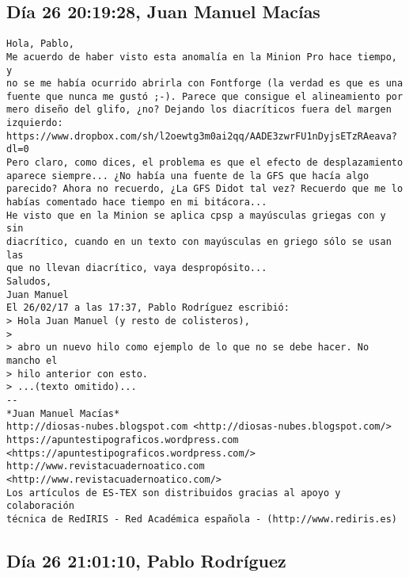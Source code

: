 \documentclass[a4paper,10pt]{article}
\begin{document}
\subsection{Día 26 20:19:28, Juan Manuel Macías}

\begin{lstlisting}
Hola, Pablo,
Me acuerdo de haber visto esta anomalía en la Minion Pro hace tiempo, y 
no se me había ocurrido abrirla con Fontforge (la verdad es que es una 
fuente que nunca me gustó ;-). Parece que consigue el alineamiento por 
mero diseño del glifo, ¿no? Dejando los diacríticos fuera del margen 
izquierdo:
https://www.dropbox.com/sh/l2oewtg3m0ai2qq/AADE3zwrFU1nDyjsETzRAeava?dl=0
Pero claro, como dices, el problema es que el efecto de desplazamiento 
aparece siempre... ¿No había una fuente de la GFS que hacía algo 
parecido? Ahora no recuerdo, ¿La GFS Didot tal vez? Recuerdo que me lo 
habías comentado hace tiempo en mi bitácora...
He visto que en la Minion se aplica cpsp a mayúsculas griegas con y sin 
diacrítico, cuando en un texto con mayúsculas en griego sólo se usan las 
que no llevan diacrítico, vaya despropósito...
Saludos,
Juan Manuel
El 26/02/17 a las 17:37, Pablo Rodríguez escribió:
> Hola Juan Manuel (y resto de colisteros),
>
> abro un nuevo hilo como ejemplo de lo que no se debe hacer. No mancho el
> hilo anterior con esto.
> ...(texto omitido)...
-- 
*Juan Manuel Macías*
http://diosas-nubes.blogspot.com <http://diosas-nubes.blogspot.com/>
https://apuntestipograficos.wordpress.com 
<https://apuntestipograficos.wordpress.com/>
http://www.revistacuadernoatico.com <http://www.revistacuadernoatico.com/>
Los artículos de ES-TEX son distribuidos gracias al apoyo y colaboración 
técnica de RedIRIS - Red Académica española - (http://www.rediris.es)

\end{lstlisting}

\subsection{Día 26 21:01:10, Pablo Rodríguez}
\end{document}
